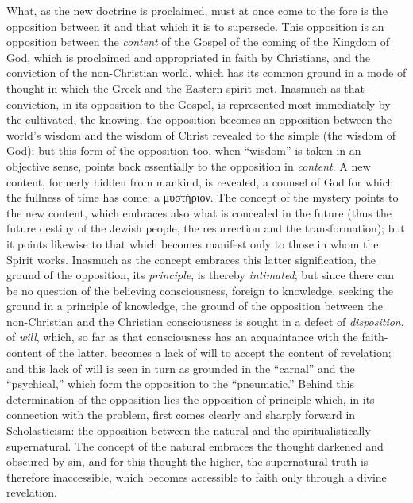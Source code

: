 \documentclass[12pt,a4paper]{book}
\begin{document}
\noindent What, as the new doctrine is proclaimed, must at once come to the
fore is the opposition between it and that which it is to supersede. This
opposition is an opposition between the \emph{content} of the Gospel of the coming
of the Kingdom of God, which is proclaimed and appropriated in faith by
Christians, and the conviction of the non-Christian world, which has its
common ground in a mode of thought in which the Greek and the Eastern spirit
met. Inasmuch as that conviction, in its opposition to the Gospel, is
represented most immediately by the cultivated, the knowing, the opposition
becomes an opposition between the world's wisdom and the wisdom of Christ
revealed to the simple (the wisdom of God); but this form of the opposition
too, when ``wisdom'' is taken in an objective sense, points back essentially
to the opposition in \emph{content}. A new content, formerly hidden from mankind,
is revealed, a counsel of God for which the fullness of time has come: a
μυστήριον. The concept of the mystery points to the new content, which
embraces also what is concealed in the future (thus the future destiny of
the Jewish people, the resurrection and the transformation); but it points
likewise to that which becomes manifest only to those in whom the Spirit
works. Inasmuch as the concept embraces this latter signification, the
ground of the opposition, its \emph{principle}, is thereby \emph{intimated}; but since
there can be no question of the believing consciousness, foreign to
knowledge, seeking the ground in a principle of knowledge, the ground of the
opposition between the non-Christian and the Christian consciousness is
sought in a defect of \emph{disposition}, of \emph{will}, which, so far as that
consciousness has an acquaintance with the faith-content of the latter,
becomes a lack of will to accept the content of revelation; and this lack of
will is seen in turn as grounded in the ``carnal'' and the ``psychical,''
which form the opposition to the ``pneumatic.'' Behind this determination of
the opposition lies the opposition of principle which, in its connection
with the problem, first comes clearly and sharply forward in
Scholasticism: the opposition between the natural and the spiritualistically
supernatural. The concept of the natural embraces the thought darkened and
obscured by sin, and for this thought the higher, the supernatural truth is
therefore inaccessible, which becomes accessible to faith only through a
divine revelation.
\end{document}
